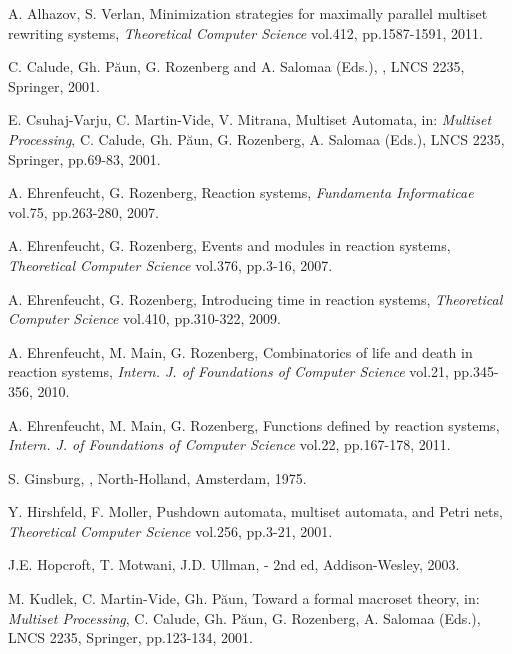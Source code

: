 \documentclass[preprint,fleqn,1p]{elsarticle}
\begin{document}
\begin{thebibliography}{00}

A. Alhazov, S. Verlan,   
\newblock Minimization strategies for maximally parallel multiset rewriting systems, {\it Theoretical Computer Science} vol.412,  pp.1587-1591, 2011.


C. Calude, Gh. P\u aun, G. Rozenberg and A. Salomaa (Eds.),  
, LNCS 2235, 
Springer, 2001.

E. Csuhaj-Varju, C. Martin-Vide, V. Mitrana,  
\newblock Multiset Automata, in: {\it Multiset Processing}, C. Calude, Gh. P\u aun, G. Rozenberg, A. Salomaa (Eds.), LNCS 2235, 
Springer,  pp.69-83, 2001.


A. Ehrenfeucht, G. Rozenberg,   
\newblock Reaction systems, {\it Fundamenta Informaticae} vol.75,  pp.263-280, 2007.

A. Ehrenfeucht, G. Rozenberg,   
\newblock Events and modules in reaction systems, {\it Theoretical Computer Science} vol.376,  pp.3-16, 2007.

A. Ehrenfeucht, G. Rozenberg,   
\newblock Introducing time in reaction systems, {\it Theoretical Computer Science} vol.410,  pp.310-322, 2009.

A. Ehrenfeucht, M. Main, G. Rozenberg,   
\newblock Combinatorics of life and death in reaction systems, {\it Intern. J. of Foundations of Computer Science} vol.21,  pp.345-356, 2010.

A. Ehrenfeucht, M. Main, G. Rozenberg,   
\newblock Functions defined by reaction systems, {\it Intern. J. of Foundations of Computer Science} vol.22,  pp.167-178, 2011.

S. Ginsburg,   
,  North-Holland, Amsterdam, 1975.

Y. Hirshfeld, F. Moller,   
\newblock Pushdown automata, multiset automata, and Petri nets, {\it Theoretical Computer Science} vol.256,  pp.3-21, 2001.



J.E. Hopcroft, T. Motwani, J.D. Ullman,   
 - 2nd ed, 
\newblock Addison-Wesley, 2003.


M. Kudlek, C. Martin-Vide, Gh. P\u aun,  
\newblock Toward a formal macroset theory, in: {\it Multiset Processing}, C. Calude, Gh. P\u aun, G. Rozenberg, A. Salomaa (Eds.), LNCS 2235, 
Springer,  pp.123-134, 2001.



\end{thebibliography}
\end{document}
